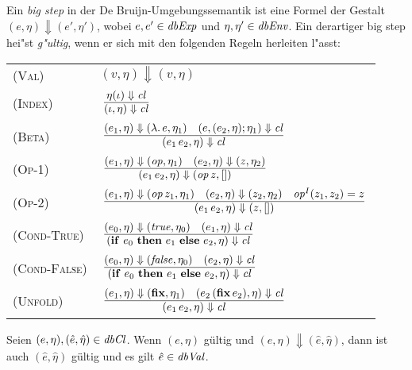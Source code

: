 \documentclass[12pt,fleqn,a4paper]{article}
\newcommand{\RN}[1]{\mbox{\textsc{(#1)}}}
\newcommand{\cl}{\name{cl}}
\begin{document}
\begin{definition}
Ein {\em big step} in der De Bruijn-Umgebungssemantik ist eine Formel der Gestalt $(e,\eta) \Downarrow (e',\eta')$,
wobei $e,e'\in{\text{\it dbExp\/}}$ und $\eta,\eta'\in{\text{\it dbEnv\/}}$. Ein derartiger big step hei"st {\em g"ultig}, wenn er sich mit den
folgenden Regeln herleiten l"asst: \\[5mm]
\begin{tabular}{ll}
  \RN{Val}        & $(v,\eta) \Downarrow (v,\eta)$ \\[3mm]
  \RN{Index}      & $\regel{\eta(\iota) \Downarrow \cl}
                           {(\iota,\eta) \Downarrow \cl}$ \\[3mm]
  \RN{Beta}       & $\regel{(e_1,\eta) \Downarrow (\abstr{}{e},\eta_1)
                            \quad (e,(e_2,\eta);\eta_1) \Downarrow \cl}
                           {(\app{e_1}{e_2},\eta) \Downarrow \cl}$ \\[3mm]
  \RN{Op-1}       & $\regel{(e_1,\eta) \Downarrow (\op,\eta_1) \quad (e_2,\eta) \Downarrow (z,\eta_2)}
                           {(\app{e_1}{e_2},\eta) \Downarrow (\app{\op}{z},[])}$ \\[3mm]
  \RN{Op-2}       & $\regel{(e_1,\eta) \Downarrow (\app{\op}{z_1},\eta_1)
                            \quad (e_2,\eta) \Downarrow (z_2,\eta_2)
                            \quad \op^I(z_1,z_2) = z}
                           {(\app{e_1}{e_2},\eta) \Downarrow (z,[])}$ \\[3mm]
  \RN{Cond-True}  & $\regel{(e_0,\eta) \Downarrow (\true,\eta_0) \quad (e_1,\eta) \Downarrow \cl}
                           {(\bifte{e_0}{e_1}{e_2},\eta) \Downarrow \cl}$ \\[3mm]
  \RN{Cond-False} & $\regel{(e_0,\eta) \Downarrow (\false,\eta_0) \quad (e_2,\eta) \Downarrow \cl}
                           {(\bifte{e_0}{e_1}{e_2},\eta) \Downarrow \cl}$ \\[3mm]
  \RN{Unfold}     & $\regel{(e_1,\eta) \Downarrow (\bfix,\eta_1)
                            \quad (\app{e_2}{(\app{\bfix}{e_2})},\eta) \Downarrow \cl}
                           {(\app{e_1}{e_2},\eta) \Downarrow \cl}$
\end{tabular}
\end{definition}

\begin{lemma}
  Seien $(e,\eta),(\hat{e},\hat{\eta})\in{\text{\it dbCl\/}}$. Wenn $(e,\eta)$ g\"ultig und
  $(e,\eta) \Downarrow (\hat{e},\hat{\eta})$, dann ist auch $(\hat{e},\hat{\eta})$
  g\"ultig und es gilt $\hat{e}\in{\text{\it dbVal\/}}$.
\end{lemma}
\end{document}
